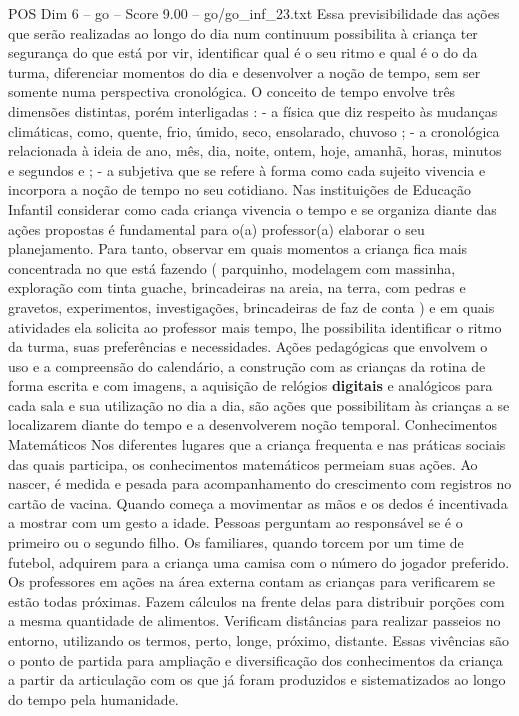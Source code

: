 \begin{textsample}{POS Dim 6 – go – Score 9.00 – go/go\_inf\_23.txt}
Essa previsibilidade das ações que serão realizadas ao longo do dia num continuum possibilita à criança ter segurança do que está por vir, identificar qual é o seu ritmo e qual é o do da turma, diferenciar momentos do dia e desenvolver a noção de tempo, sem ser somente numa perspectiva cronológica.
O conceito de tempo envolve três dimensões distintas, porém interligadas : - a física que diz respeito às mudanças climáticas, como, quente, frio, úmido, seco, ensolarado, chuvoso ; - a cronológica relacionada à ideia de ano, mês, dia, noite, ontem, hoje, amanhã, horas, minutos e segundos e ; - a subjetiva que se refere à forma como cada sujeito vivencia e incorpora a noção de tempo no seu cotidiano.
Nas instituições de Educação Infantil considerar como cada criança vivencia o tempo e se organiza diante das ações propostas é fundamental para o(a) professor(a) elaborar o seu planejamento.
Para tanto, observar em quais momentos a criança fica mais concentrada no que está fazendo ( parquinho, modelagem com massinha, exploração com tinta guache, brincadeiras na areia, na terra, com pedras e gravetos, experimentos, investigações, brincadeiras de faz de conta ) e em quais atividades ela solicita ao professor mais tempo, lhe possibilita identificar o ritmo da turma, suas preferências e necessidades.
Ações pedagógicas que envolvem o uso e a compreensão do calendário, a construção com as crianças da rotina de forma escrita e com imagens, a aquisição de relógios \textbf{digitais} e analógicos para cada sala e sua utilização no dia a dia, são ações que possibilitam às crianças a se localizarem diante do tempo e a desenvolverem noção temporal.
Conhecimentos Matemáticos Nos diferentes lugares que a criança frequenta e nas práticas sociais das quais participa, os conhecimentos matemáticos permeiam suas ações.
Ao nascer, é medida e pesada para acompanhamento do crescimento com registros no cartão de vacina.
Quando começa a movimentar as mãos e os dedos é incentivada a mostrar com um gesto a idade.
Pessoas perguntam ao responsável se é o primeiro ou o segundo filho.
Os familiares, quando torcem por um time de futebol, adquirem para a criança uma camisa com o número do jogador preferido.
Os professores em ações na área externa contam as crianças para verificarem se estão todas próximas.
Fazem cálculos na frente delas para distribuir porções com a mesma quantidade de alimentos.
Verificam distâncias para realizar passeios no entorno, utilizando os termos, perto, longe, próximo, distante.
Essas vivências são o ponto de partida para ampliação e diversificação dos conhecimentos da criança a partir da articulação com os que já foram produzidos e sistematizados ao longo do tempo pela humanidade.

\end{textsample}
